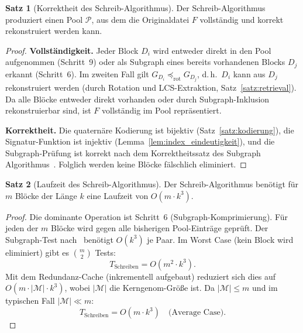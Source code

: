 ﻿\documentclass[a4paper,12pt]{article}
\theoremstyle{definition}
\newtheorem{satz}{Satz}
\begin{document}
\begin{satz}[Korrektheit des Schreib-Algorithmus]
    \label{satz:schreib_korrekt}
    Der Schreib-Algorithmus produziert einen Pool $\mathcal{P}$, aus dem
    die Originaldatei $F$ vollst\"{a}ndig und korrekt rekonstruiert werden kann.
\end{satz}

\begin{proof}
    \textbf{Vollst\"{a}ndigkeit.}
    Jeder Block $D_i$ wird entweder direkt in den Pool aufgenommen
    (Schritt~9) oder als Subgraph eines bereits vorhandenen Blocks $D_j$
    erkannt (Schritt~6). Im zweiten Fall gilt $G_{D_i} \preceq_{\mathrm{rot}}
    G_{D_j}$, d.\,h.\ $D_i$ kann aus $D_j$ rekonstruiert werden
    (durch Rotation und LCS-Extraktion, Satz~\ref{satz:retrieval}).
    Da alle Bl\"{o}cke entweder direkt vorhanden oder durch Subgraph-Inklusion
    rekonstruierbar sind, ist $F$ vollst\"{a}ndig im Pool repr\"{a}sentiert.

    \textbf{Korrektheit.}
    Die quaternäre Kodierung ist bijektiv (Satz~\ref{satz:kodierung}),
    die Signatur-Funktion ist injektiv (Lemma~\ref{lem:index_eindeutigkeit}),
    und die Subgraph-Pr\"{u}fung ist korrekt nach dem Korrektheitssatz
    des Subgraph Algorithmus~\cite{epp2026}.
    Folglich werden keine Bl\"{o}cke f\"{a}lschlich eliminiert. 
\end{proof}

\begin{satz}[Laufzeit des Schreib-Algorithmus]
    \label{satz:schreib_laufzeit}
    Der Schreib-Algorithmus ben\"{o}tigt f\"{u}r $m$ Bl\"{o}cke
    der L\"{a}nge $k$ eine Laufzeit von $O(m \cdot k^3)$.
\end{satz}

\begin{proof}
    Die dominante Operation ist Schritt~6 (Subgraph-Komprimierung).
    F\"{u}r jeden der $m$ Bl\"{o}cke wird gegen alle bisherigen
    Pool-Eintr\"{a}ge gepr\"{u}ft. Der Subgraph-Test nach~\cite{epp2026}
    ben\"{o}tigt $O(k^3)$ je Paar. Im Worst Case (kein Block wird eliminiert)
    gibt es $\binom{m}{2}$ Tests:
    \[
        T_{\text{Schreiben}} = O(m^2 \cdot k^3).
    \]
    Mit dem Redundanz-Cache (inkrementell aufgebaut) reduziert sich
    dies auf $O(m \cdot |\mathcal{M}| \cdot k^3)$, wobei
    $|\mathcal{M}|$ die Kerngenom-Gr\"{o}\ss{}e ist.
    Da $|\mathcal{M}| \le m$ und im typischen Fall $|\mathcal{M}| \ll m$:
    \[
        T_{\text{Schreiben}} = O(m \cdot k^3)
        \quad \text{(Average Case)}.
    \]
\end{proof}
\end{document}
